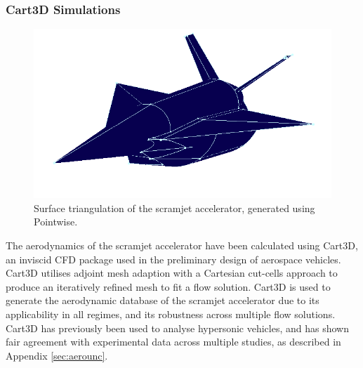 \subsubsection{Cart3D Simulations}\label{sec:cart3d}
\begin{figure}[ht]
	\centering
	\includegraphics[width=0.6\linewidth]{figures/3_vehicle_design/Pointwise}
	\caption{Surface triangulation of the scramjet accelerator, generated using Pointwise\cite{Pointwise}.}
	\label{fig:Pointwise}
\end{figure}
\noindent
The aerodynamics of the scramjet accelerator have been calculated using Cart3D, an inviscid CFD package used in the preliminary design of aerospace vehicles. Cart3D utilises adjoint mesh adaption with a Cartesian cut-cells approach to produce an iteratively refined mesh to fit a flow solution. Cart3D is used to generate the aerodynamic database of the scramjet accelerator due to its applicability in all regimes, and its robustness across multiple flow solutions\cite{Sagerman2017,Abeynayake,Aftosmis2011,Almosnino2016a,Gomez2004,Ward2018,Kiris2011}. Cart3D has previously been used to
analyse hypersonic vehicles, and has shown fair agreement with experimental data across multiple studies\cite{Abeynayake2013a,Ward2018,Kiris2011}, as described in Appendix \textcolor{black}{\ref{sec:aerounc}}.
